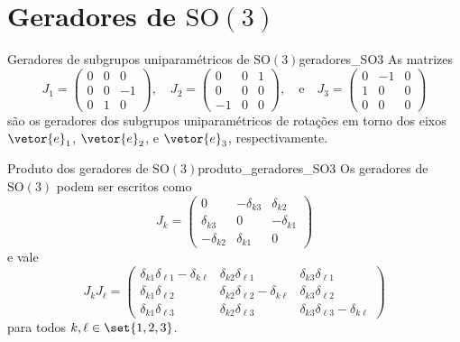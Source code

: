 \section[Geradores de SO(3)]{Geradores de \(\mathrm{SO}(3)\)}
\begin{definition}{Geradores de subgrupos uniparamétricos de \(\mathrm{SO}(3)\)}{geradores_SO3}
    As matrizes
    \begin{equation*}
        J_1 = \begin{pmatrix}
            0 & 0 & 0\\
            0 & 0 & -1\\
            0 & 1 & 0
        \end{pmatrix},\quad
        J_2 = \begin{pmatrix}
            0 & 0 & 1\\
            0 & 0 & 0\\
            -1 & 0 & 0
        \end{pmatrix},\quad\text{e}\quad
        J_3 = \begin{pmatrix}
            0 & -1 & 0\\
            1 & 0 & 0\\
            0 & 0 & 0
        \end{pmatrix}
    \end{equation*}
    são os geradores dos subgrupos uniparamétricos de rotações em torno dos eixos \(\vetor{e}_1\), \(\vetor{e}_2\), e \(\vetor{e}_3\), respectivamente.
\end{definition}
\begin{lemma}{Produto dos geradores de \(\mathrm{SO}(3)\)}{produto_geradores_SO3}
    Os geradores de \(\mathrm{SO}(3)\) podem ser escritos como
    \begin{equation*}
        J_k = \begin{pmatrix}
            0 & -\delta_{k3} & \delta_{k2}\\
            \delta_{k3} & 0 & -\delta_{k1}\\
            -\delta_{k2} & \delta_{k1} & 0
        \end{pmatrix}
    \end{equation*}
    e vale
    \begin{equation*}
        J_k J_\ell = \begin{pmatrix}
            \delta_{k1}\delta_{\ell 1} - \delta_{k\ell} & \delta_{k2} \delta_{\ell 1} & \delta_{k3} \delta_{\ell 1}\\
            \delta_{k1} \delta_{\ell2} & \delta_{k2} \delta_{\ell 2} - \delta_{k \ell} & \delta_{k3} \delta_{\ell 2}\\
            \delta_{k1} \delta_{\ell3} & \delta_{k2} \delta_{\ell 3} & \delta_{k3}\delta_{\ell 3} - \delta_{k\ell}
        \end{pmatrix}
    \end{equation*}
    para todos \(k, \ell \in \set{1,2,3}\).
\end{lemma}
